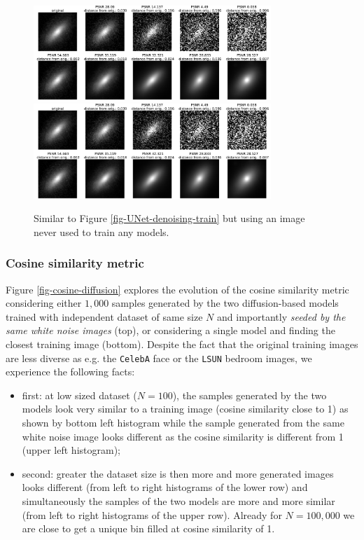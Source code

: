 \documentclass[11pt]{amsart}
\begin{document}
\begin{figure}
    \centering
		\includegraphics[width=0.8\textwidth]{fig-UNet_100000_denoising_test.pdf}\\
		\includegraphics[width=0.8\textwidth, trim={0 0 0 25cm},clip=True]{fig-UNet_100000_denoising_test.pdf}
	\caption{Similar to  Figure \ref{fig-UNet-denoising-train} but  using an image never used to train any models.}
	\label{fig-UNet-denoising-test}
\end{figure}
%
\subsubsection{Cosine similarity metric}
Figure \ref{fig-cosine-diffusion} explores the evolution of the cosine similarity metric considering either $1,000$ samples generated by the two diffusion-based models trained with independent dataset of same size $N$ and importantly \textit{seeded by the same white noise images} (top), or considering a single model and finding the closest training image (bottom). Despite the fact that the original training images are less diverse as e.g. the \texttt{CelebA} face or the \texttt{LSUN} bedroom images, we experience the following facts: 
\begin{itemize}
\item first: at low sized dataset ($N=100$), the samples generated by the two models look very similar to a training image (cosine similarity close to 1) as shown by bottom left histogram while the sample generated from the same white noise image looks different as the cosine similarity is different from 1 (upper left histogram);
\item second: greater the dataset size is then more and more generated images looks different (from left to right histograms of the lower row) and simultaneously the samples of the two models are more and more similar (from left to right histograms of the upper row). Already for $N=100,000$ we are close to get a unique bin filled at cosine similarity of 1. 
\end{itemize}
\end{document}
